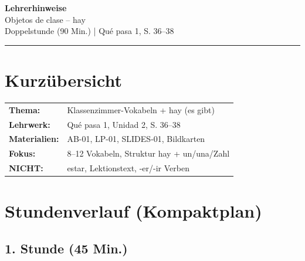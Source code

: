 \documentclass[11pt,a4paper]{article}
\begin{document}
\begin{center}
{\Large\textcolor{fach}{\textbf{Lehrerhinweise}}}\\[0.3cm]
{\large Objetos de clase -- hay}\\[0.2cm]
{\normalsize Doppelstunde (90 Min.) | Qué pasa 1, S. 36--38}
\end{center}

\vspace{0.5cm}
\hrule
\vspace{0.5cm}

\section*{Kurzübersicht}

\begin{tabular}{ll}
\textbf{Thema:} & Klassenzimmer-Vokabeln + hay (es gibt) \\
\textbf{Lehrwerk:} & Qué pasa 1, Unidad 2, S. 36--38 \\
\textbf{Materialien:} & AB-01, LP-01, SLIDES-01, Bildkarten \\
\textbf{Fokus:} & 8--12 Vokabeln, Struktur hay + un/una/Zahl \\
\textbf{NICHT:} & estar, Lektionstext, -er/-ir Verben \\
\end{tabular}

\vspace{0.5cm}

\section*{Stundenverlauf (Kompaktplan)}

\subsection*{1. Stunde (45 Min.)}
\end{document}
